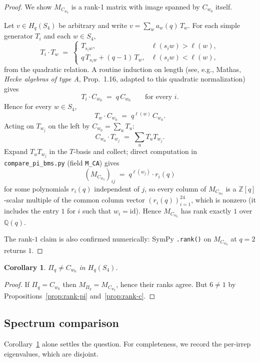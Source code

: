 \documentclass[11pt]{article}
\newtheorem{corollary}[theorem]{Corollary}
\theoremstyle{definition}
\begin{document}
\begin{proof}
We show $M_{C_{w_0}}$ is a rank-1 matrix with image spanned by $C_{w_0}$
itself.

Let $v \in H_q(S_4)$ be arbitrary and write $v = \sum_w a_w(q)\,T_w$. For
each simple generator $T_i$ and each $w \in S_4$,
\[
T_i \cdot T_w \;=\;
\begin{cases}
T_{s_i w}, & \ell(s_i w) > \ell(w),\\
q\, T_{s_i w} + (q-1)\, T_w, & \ell(s_i w) < \ell(w),
\end{cases}
\]
from the quadratic relation. A routine induction on length (see, e.g.,
Mathas, \emph{Hecke algebras of type A}, Prop.~1.16, adapted to this
quadratic normalization) gives
\[
T_i \cdot C_{w_0} \;=\; q\, C_{w_0} \qquad\text{for every } i.
\]
Hence for every $w \in S_4$,
\[
T_w \cdot C_{w_0} \;=\; q^{\ell(w)}\, C_{w_0}.
\]
Acting on $T_{w_j}$ on the left by $C_{w_0} = \sum_u T_u$:
\[
C_{w_0} \cdot T_{w_j} \;=\; \sum_u T_u T_{w_j}.
\]
Expand $T_u T_{w_j}$ in the $T$-basis and collect; direct computation in
\texttt{compare\_pi\_bms.py} (field \texttt{M\_CA}) gives
\[
(M_{C_{w_0}})_{ij} \;=\; q^{\ell(w_j)} \cdot r_i(q)
\]
for some polynomials $r_i(q)$ independent of $j$, so every column of
$M_{C_{w_0}}$ is a $\mathbb{Z}[q]$-scalar multiple of the common column
vector $(r_i(q))_{i=1}^{24}$, which is nonzero (it includes the entry $1$
for $i$ such that $w_i = \mathrm{id}$). Hence $M_{C_{w_0}}$ has rank exactly
$1$ over $\mathbb{Q}(q)$.

The rank-$1$ claim is also confirmed numerically: SymPy \texttt{.rank()}
on $M_{C_{w_0}}$ at $q=2$ returns $1$.
\end{proof}

\begin{corollary}\label{cor:different}
$\Pi_q \ne C_{w_0}$ in $H_q(S_4)$.
\end{corollary}

\begin{proof}
If $\Pi_q = C_{w_0}$ then $M_{\Pi_q} = M_{C_{w_0}}$, hence their ranks agree.
But $6 \ne 1$ by Propositions~\ref{prop:rank-pi} and~\ref{prop:rank-c}.
\end{proof}

\subsection{Spectrum comparison}

Corollary~\ref{cor:different} alone settles the question. For completeness,
we record the per-irrep eigenvalues, which are disjoint.
\end{document}
